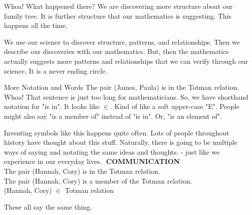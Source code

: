 \documentclass{ximera}
\begin{document}
Whoa!  What happened there?  We are discovering more structure about our family tree.  It is further structure that our mathematics is suggesting.  This happens all the time.  

We use our science to discover structure, patterns, and relationships.  Then we describe our discoveries with our mathematics.  But, then the mathematics actually suggests more patterns and relationships that we can verify through our science. It is a never ending circle.





More Notation and Words 
The pair (James, Paula) is in the Totman relation. 
Whoa! That sentence is just too long for mathematicians. So, we have shorthand notation for "is in".  It looks like $\in$.  Kind of like a soft upper-case "E".  People might also say "is a member of" instead of "is in".  Or, "is an element of".

Inventing symbols like this happens quite often. Lots of people throughout history have thought about this stuff. Naturally, there is going to be multiple ways of saying and notating the same ideas and thoughts. - just like we experience in our everyday lives.
\textbf{COMMUNICATION} \\
The pair (Hannah, Cory) is in the Totman relation. \\
The pair (Hannah, Cory) is a member of the Totman relation. \\
(Hannah, Cory) $\in$ Totman relation \\

\begin{center}
These all say the same thing.
\end{center}
\end{document}

